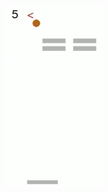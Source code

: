 \begin{figure}[h]
	\begin{subfigure}[b]{0.23\textwidth}
		\includegraphics[width=\textwidth]{images/breakout-33-lr-2bis.png}
	\end{subfigure}
	~ %
	\begin{subfigure}[b]{0.23\textwidth}

\end{subfigure}
\end{figure}
